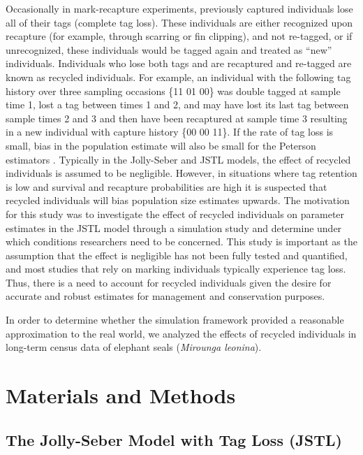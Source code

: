 \documentclass[12pt]{article}
\begin{document}
Occasionally in mark-recapture experiments, previously captured
individuals lose all of their tags (complete tag loss). These
individuals are either recognized upon recapture (for example, through
scarring or fin clipping), and not re-tagged, or if unrecognized, these
individuals would be tagged again and treated as ``new'' individuals.
Individuals who lose both tags and are recaptured and re-tagged are
known as recycled individuals. For example, an individual with the
following tag history over three sampling occasions \{11 01 00\} was
double tagged at sample time 1, lost a tag between times 1 and 2, and may have
lost its last tag between sample times 2 and 3 and then have been
recaptured at sample time 3 resulting in a new individual with
capture history \{00 00 11\}. If the rate of tag loss is small, bias in
the population estimate will also be small for the Peterson estimators
\citep{Seber:1981}. Typically in the Jolly-Seber and JSTL models, the
effect of recycled individuals is assumed to be negligible. However, in
situations where tag retention is low and survival and recapture
probabilities are high it is suspected that recycled individuals will
bias population size estimates upwards. The motivation for this study
was to investigate the effect of recycled individuals on parameter
estimates in the JSTL model through a simulation study and determine
under which conditions researchers need to be concerned.  This study is important as the assumption that the effect is negligible has not been fully tested and quantified, and most studies that rely on marking individuals typically experience tag loss. Thus, there is a need to account for recycled individuals given the desire for accurate and robust estimates for management and conservation purposes.

In order to determine whether the simulation framework provided a
reasonable approximation to the real world, we analyzed the effects of
recycled individuals in long-term census data of elephant seals (\textit{Mirounga leonina}). 

\section{Materials and Methods}\label{methods}

\subsection{The Jolly-Seber Model with Tag Loss
(JSTL)}\label{the-jolly-seber-model-with-tag-loss-jstl}
\end{document}
